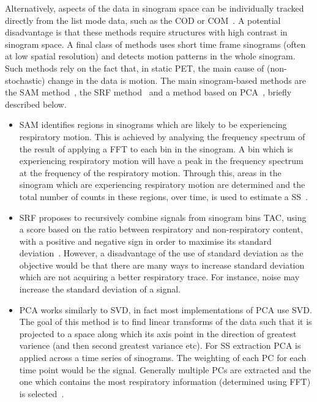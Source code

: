     Alternatively, aspects of the data in sinogram space can be individually tracked directly from the list mode data, such as the \gls{COD} or \gls{COM}~\parencite{Klein2001Fine-scaleInformation, Bruyant2002CorrectionPhantom, Ren2017Data-drivenDistribution, Feng2018Self-gating:PET}. A potential disadvantage is that these methods require structures with high contrast in sinogram space. A final class of methods uses short time frame sinograms (often at low spatial resolution) and detects motion patterns in the whole sinogram. Such methods rely on the fact that, in static \gls{PET}, the main cause of (non-stochastic) change in the data is motion. The main sinogram-based methods are the \gls{SAM} method~\parencite{Schleyer2009, Schleyer2011, Schleyer2018Data-DrivenMotion}, the \gls{SRF} method~\parencite{Kesner2010AMethods} and a method based on \gls{PCA}~\parencite{Thielemans2011, Bertolli2018Data-DrivenTomography}, briefly described below.

    \begin{itemize}
        \item \gls{SAM} identifies regions in sinograms which are likely to be experiencing respiratory motion. This is achieved by analysing the frequency spectrum of the result of applying a \gls{FFT} to each bin in the sinogram. A bin which is experiencing respiratory motion will have a peak in the frequency spectrum at the frequency of the respiratory motion. Through this, areas in the sinogram which are experiencing respiratory motion are determined and the total number of counts in these regions, over time, is used to estimate a \gls{SS}~\parencite{Schleyer2009, Schleyer2011, Schleyer2018Data-DrivenMotion}.

        \item \gls{SRF} proposes to recursively combine signals from sinogram bins \gls{TAC}, using a score based on the ratio between respiratory and non-respiratory content, with a positive and negative sign in order to maximise its standard deviation~\parencite{Kesner2010AMethods}. However, a disadvantage of the use of standard deviation as the objective would be that there are many ways to increase standard deviation which are not acquiring a better respiratory trace. For instance, noise may increase the standard deviation of a signal.

        \item \gls{PCA} works similarly to \gls{SVD}, in fact most implementations of \gls{PCA} use \gls{SVD}. The goal of this method is to find linear transforms of the data such that it is projected to a space along which its axis point in the direction of greatest varience (and then second greatest variance etc). For \gls{SS} extraction \gls{PCA} is applied across a time series of sinograms. The weighting of each \gls{PC} for each time point would be the signal. Generally multiple \glspl{PC} are extracted and the one which contains the most respiratory information (determined using \gls{FFT}) is selected~\parencite{Thielemans2011, Bertolli2018Data-DrivenTomography}.
    \end{itemize}
    
